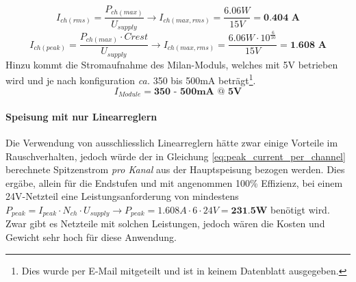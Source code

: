 \begin{equation}
	I_{ch(rms)} = \frac{P_{ch(max)}}{U_{supply}} \rightarrow I_{ch(max,rms)} = \frac{6.06W}{15V} = \textbf{0.404 A}
	\label{eq:rms_current_per_channel}
\end{equation}
\begin{equation}
	I_{ch(peak)} = \frac{P_{ch(max)} \cdot Crest}{U_{supply}}  \rightarrow I_{ch(max,rms)} = \frac{6.06W \cdot 10^{\frac{6}{10}}}{15V} = \textbf{1.608 A}
	\label{eq:peak_current_per_channel}
\end{equation}
Hinzu kommt die Stromaufnahme des Milan-Moduls, welches mit 5V betrieben wird und je nach konfiguration \textit{ca.} 350 bis 500mA beträgt\footnote{Dies wurde per E-Mail mitgeteilt und ist in keinem Datenblatt ausgegeben.}.
\begin{equation}
	I_{Module} = \textbf{350 - 500mA @ 5V}
\end{equation}
\paragraph{Speisung mit nur Linearreglern} Die Verwendung von ausschliesslich Linearreglern hätte zwar einige Vorteile im Rauschverhalten, jedoch würde der in Gleichung \ref{eq:peak_current_per_channel} berechnete Spitzenstrom \textit{pro Kanal} aus der Hauptspeisung bezogen werden. Dies ergäbe, allein für die Endstufen und mit angenommen 100\% Effizienz, bei einem 24V-Netzteil eine Leistungsanforderung von mindestens $P_{peak} = I_{peak} \cdot N_{ch} \cdot U_{supply} \rightarrow P_{peak} = 1.608A \cdot 6 \cdot 24V = \textbf{231.5W}$ benötigt wird. Zwar gibt es Netzteile mit solchen Leistungen, jedoch wären die Kosten und Gewicht sehr hoch für diese Anwendung.
